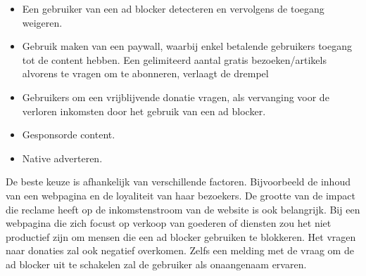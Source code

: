 \documentclass[pdftex,a4paper,12pt,twoside]{report}
\begin{document}
\begin{itemize}
	\item Een gebruiker van een ad blocker detecteren en vervolgens de toegang weigeren.
	\item Gebruik maken van een paywall, waarbij enkel betalende gebruikers toegang tot de content hebben. Een gelimiteerd aantal gratis bezoeken/artikels alvorens te vragen om te abonneren, verlaagt de drempel 
	\item Gebruikers om een vrijblijvende donatie vragen, als vervanging voor de verloren inkomsten door het gebruik van een ad blocker.
	\item Gesponsorde content.
	\item Native adverteren.
\end{itemize}

De beste keuze is afhankelijk van verschillende factoren. Bijvoorbeeld de inhoud van een webpagina en de loyaliteit van haar bezoekers. De grootte van de impact die reclame heeft op de inkomstenstroom van de website is ook belangrijk. Bij een webpagina die zich focust op verkoop van goederen of diensten zou het niet productief zijn om mensen die een ad blocker gebruiken te blokkeren. Het vragen naar donaties zal ook negatief overkomen. Zelfs een melding met de vraag om de ad blocker uit te schakelen zal de gebruiker als onaangenaam ervaren.
\end{document}
